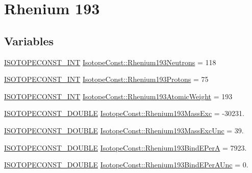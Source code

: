 \hypertarget{group___isotope_const-_rhenium-_re193}{}\section{Rhenium 193}
\label{group___isotope_const-_rhenium-_re193}
\subsection*{Variables}
\begin{DoxyCompactItemize}
\item 
\mbox{\hyperlink{group___isotope_const-_macros_ga5f18360b3e99483a35c32d789e62621c}{I\+S\+O\+T\+O\+P\+E\+C\+O\+N\+S\+T\+\_\+\+I\+NT}} \mbox{\hyperlink{group___isotope_const-_rhenium-_re193_gacf39959bab8262870a2e68313b57468f}{Isotope\+Const\+::\+Rhenium193\+Neutrons}} = 118
\item 
\mbox{\hyperlink{group___isotope_const-_macros_ga5f18360b3e99483a35c32d789e62621c}{I\+S\+O\+T\+O\+P\+E\+C\+O\+N\+S\+T\+\_\+\+I\+NT}} \mbox{\hyperlink{group___isotope_const-_rhenium-_re193_gae6eafc7d39bbb5c5e027f91678c3f28b}{Isotope\+Const\+::\+Rhenium193\+Protons}} = 75
\item 
\mbox{\hyperlink{group___isotope_const-_macros_ga5f18360b3e99483a35c32d789e62621c}{I\+S\+O\+T\+O\+P\+E\+C\+O\+N\+S\+T\+\_\+\+I\+NT}} \mbox{\hyperlink{group___isotope_const-_rhenium-_re193_gac404a0d6eab49b0e084075d1a3dde4e5}{Isotope\+Const\+::\+Rhenium193\+Atomic\+Weight}} = 193
\item 
\mbox{\hyperlink{group___isotope_const-_macros_ga8f45a7272ce02c0b4c65c44636ed719a}{I\+S\+O\+T\+O\+P\+E\+C\+O\+N\+S\+T\+\_\+\+D\+O\+U\+B\+LE}} \mbox{\hyperlink{group___isotope_const-_rhenium-_re193_gabbdcdcf72d34de8b7b54a9b12efb6f59}{Isotope\+Const\+::\+Rhenium193\+Mass\+Exc}} = -\/30231.
\item 
\mbox{\hyperlink{group___isotope_const-_macros_ga8f45a7272ce02c0b4c65c44636ed719a}{I\+S\+O\+T\+O\+P\+E\+C\+O\+N\+S\+T\+\_\+\+D\+O\+U\+B\+LE}} \mbox{\hyperlink{group___isotope_const-_rhenium-_re193_ga7921ca6b92b82dccca679b951b8451cd}{Isotope\+Const\+::\+Rhenium193\+Mass\+Exc\+Unc}} = 39.
\item 
\mbox{\hyperlink{group___isotope_const-_macros_ga8f45a7272ce02c0b4c65c44636ed719a}{I\+S\+O\+T\+O\+P\+E\+C\+O\+N\+S\+T\+\_\+\+D\+O\+U\+B\+LE}} \mbox{\hyperlink{group___isotope_const-_rhenium-_re193_ga509c5ae33ba2b38d0b6aa2d8d1029c98}{Isotope\+Const\+::\+Rhenium193\+Bind\+E\+PerA}} = 7923.
\item 
\mbox{\hyperlink{group___isotope_const-_macros_ga8f45a7272ce02c0b4c65c44636ed719a}{I\+S\+O\+T\+O\+P\+E\+C\+O\+N\+S\+T\+\_\+\+D\+O\+U\+B\+LE}} \mbox{\hyperlink{group___isotope_const-_rhenium-_re193_ga29b7b8287db748b96cc3c9b311b66414}{Isotope\+Const\+::\+Rhenium193\+Bind\+E\+Per\+A\+Unc}} = 0.

\end{DoxyCompactItemize}
